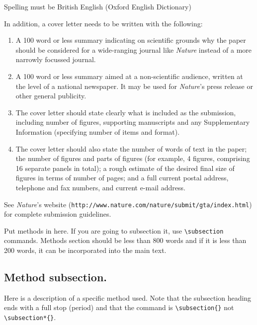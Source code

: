 \documentclass{naturemod}
\begin{document}
Spelling must be British English (Oxford English Dictionary)

In addition, a cover letter needs to be written with the
following:
\begin{enumerate}
 \item A 100 word or less summary indicating on scientific grounds
why the paper should be considered for a wide-ranging journal like
\textsl{Nature} instead of a more narrowly focussed journal.
 \item A 100 word or less summary aimed at a non-scientific audience,
written at the level of a national newspaper.  It may be used for
\textsl{Nature}'s press release or other general publicity.
 \item The cover letter should state clearly what is included as the
submission, including number of figures, supporting manuscripts
and any Supplementary Information (specifying number of items and
format).
 \item The cover letter should also state the number of
words of text in the paper; the number of figures and parts of
figures (for example, 4 figures, comprising 16 separate panels in
total); a rough estimate of the desired final size of figures in
terms of number of pages; and a full current postal address,
telephone and fax numbers, and current e-mail address.
\end{enumerate}

See \textsl{Nature}'s website
(\texttt{http://www.nature.com/nature/submit/gta/index.html}) for
complete submission guidelines.

\begin{methods}
Put methods in here.  If you are going to subsection it, use
\verb|\subsection| commands.  Methods section should be less than
800 words and if it is less than 200 words, it can be incorporated
into the main text.

\subsection{Method subsection.}

Here is a description of a specific method used.  Note that the
subsection heading ends with a full stop (period) and that the
command is \verb|\subsection{}| not \verb|\subsection*{}|.

\end{methods}
\end{document}
